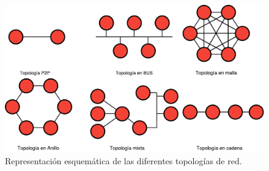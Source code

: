 \documentclass[a4paper, 11pt]{report} %
\begin{document}
\begin{figure}[H]
\centering
\includegraphics[width=\textwidth]{Resources/Top/Topdered.pdf}
\caption{Representación esquemática de las diferentes topologías de red.}
\end{figure}
\end{document}
